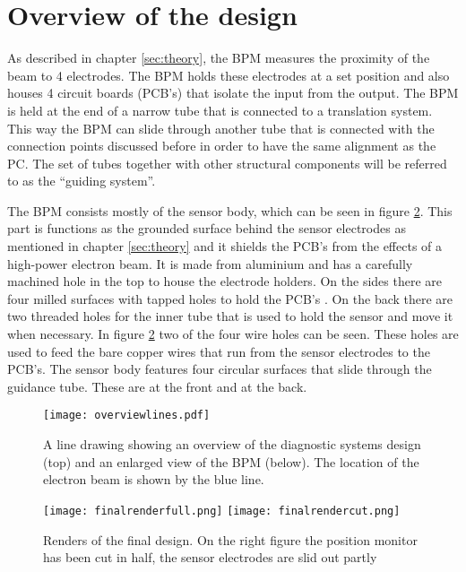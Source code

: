 \section{Overview of the design}
As described in chapter \ref{sec:theory}, the BPM measures the proximity of the beam to 4 electrodes. The BPM holds these electrodes at a set position and also houses 4 circuit boards (PCB's) that isolate the input from the output. The BPM is held at the end of a narrow tube that is connected to a translation system. This way the BPM can slide through another tube that is connected with the connection points discussed before in order to have the same alignment as the PC. The set of tubes together with other structural components will be referred to as the ``guiding system''.

The BPM consists mostly of the sensor body, which can be seen in figure \ref{fig:designfinal}. This part is functions as the grounded surface behind the sensor electrodes as mentioned in chapter \ref{sec:theory} and it shields the PCB's from the effects of a high-power electron beam.
It is made from aluminium and has a carefully machined hole in the top to house the electrode holders. On the sides there are four milled surfaces with tapped holes to hold the PCB's . On the back there are two threaded holes for the inner tube that is used to hold the sensor and move it when necessary. 
In figure \ref{fig:designfinal} two of the four wire holes can be seen. These holes are used to feed the bare copper wires that run from the sensor electrodes to the PCB's.
The sensor body features four circular surfaces that slide through the guidance tube. These are at the front and at the back.

\begin{figure}[h]
 \centering
 \texttt{[image: overviewlines.pdf]}
 \caption{A line drawing showing an overview of the diagnostic systems design (top) and an enlarged view of the BPM (below). The location of the electron beam is shown by the blue line.}
 \label{fig:designoverview}
\end{figure}

\begin{figure}[h]
  \centering
  \texttt{[image: finalrenderfull.png]}
  \texttt{[image: finalrendercut.png]}
  \caption{Renders of the final design. On the right figure the position monitor has been cut in half, the sensor electrodes are slid out partly}
  \label{fig:designfinal}
\end{figure}

